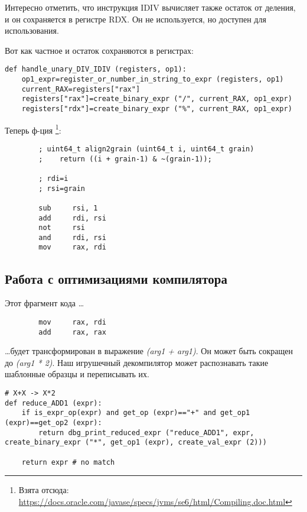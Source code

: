 

Интересно отметить, что инструкция IDIV вычисляет также остаток от деления, и он сохраняется в регистре RDX.
Он не используется, но доступен для использования.

Вот как частное и остаток сохраняются в регистрах:

\begin{lstlisting}
def handle_unary_DIV_IDIV (registers, op1):
    op1_expr=register_or_number_in_string_to_expr (registers, op1)
    current_RAX=registers["rax"]
    registers["rax"]=create_binary_expr ("/", current_RAX, op1_expr)
    registers["rdx"]=create_binary_expr ("%", current_RAX, op1_expr)
\end{lstlisting}

Теперь ф-ция \footnote{Взята отсюда: \url{https://docs.oracle.com/javase/specs/jvms/se6/html/Compiling.doc.html}}:

\begin{lstlisting}
        ; uint64_t align2grain (uint64_t i, uint64_t grain)
        ;    return ((i + grain-1) & ~(grain-1));

        ; rdi=i
        ; rsi=grain

        sub     rsi, 1
        add     rdi, rsi
        not     rsi
        and     rdi, rsi
        mov     rax, rdi
\end{lstlisting}



\subsection{Работа с оптимизациями компилятора}

Этот фрагмент кода \dots

\begin{lstlisting}
        mov     rax, rdi
        add     rax, rax
\end{lstlisting}

\dots будет трансформирован в выражение \textit{(arg1 + arg1)}.
Он может быть сокращен до \textit{(arg1 * 2)}.
Наш игрушечный декомпилятор может распознавать такие шаблонные образцы и переписывать их.

\begin{lstlisting}
# X+X -> X*2
def reduce_ADD1 (expr):
    if is_expr_op(expr) and get_op (expr)=="+" and get_op1 (expr)==get_op2 (expr):
        return dbg_print_reduced_expr ("reduce_ADD1", expr, create_binary_expr ("*", get_op1 (expr), create_val_expr (2)))

    return expr # no match
\end{lstlisting}


